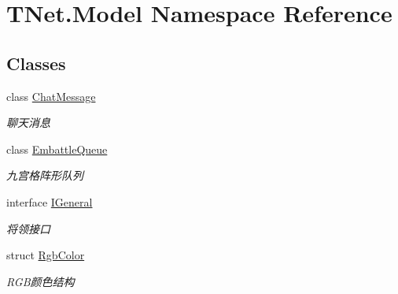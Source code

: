 \hypertarget{namespace_t_net_1_1_model}{}\section{T\+Net.\+Model Namespace Reference}
\label{namespace_t_net_1_1_model}
\subsection*{Classes}
\begin{DoxyCompactItemize}
\item 
class \mbox{\hyperlink{class_t_net_1_1_model_1_1_chat_message}{Chat\+Message}}
\begin{DoxyCompactList}\small\item\em 聊天消息 \end{DoxyCompactList}\item 
class \mbox{\hyperlink{class_t_net_1_1_model_1_1_embattle_queue}{Embattle\+Queue}}
\begin{DoxyCompactList}\small\item\em 九宫格阵形队列 \end{DoxyCompactList}\item 
interface \mbox{\hyperlink{interface_t_net_1_1_model_1_1_i_general}{I\+General}}
\begin{DoxyCompactList}\small\item\em 将领接口 \end{DoxyCompactList}\item 
struct \mbox{\hyperlink{struct_t_net_1_1_model_1_1_rgb_color}{Rgb\+Color}}
\begin{DoxyCompactList}\small\item\em R\+G\+B颜色结构 \end{DoxyCompactList}\end{DoxyCompactItemize}
